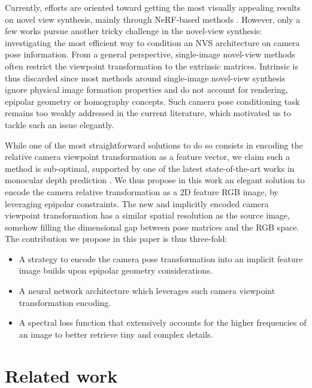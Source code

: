 Currently, efforts are oriented toward getting the most visually appealing results on novel view synthesis, mainly through NeRF-based methods \citep{mildenhall2021nerf,wang2021neus,barron2021mip,barron2022mip}. However, only a few works pursue another tricky challenge in the novel-view synthesis: investigating the most efficient way to condition an NVS architecture on camera pose information. From a general perspective, single-image novel-view methods often restrict the viewpoint transformation to the extrinsic matrices. Intrinsic is thus discarded since most methods around single-image novel-view synthesis ignore physical image formation properties and do not account for rendering, epipolar geometry or homography concepts. Such camera pose conditioning task remains too weakly addressed in the current literature, which motivated us to tackle such an issue elegantly.

While one of the most straightforward solutions to do so consists in encoding the relative camera viewpoint transformation as a feature vector, we claim such a method is sub-optimal, supported by one of the latest state-of-the-art works in monocular depth prediction \citep{zhao2021camera}. We thus propose in this work an elegant solution to encode the camera relative transformation as a 2D feature RGB image, by leveraging epipolar constraints. The new and implicitly encoded camera viewpoint transformation has a similar spatial resolution as the source image, somehow filling the dimensional gap between pose matrices and the RGB space. The contribution we propose in this paper is thus three-fold: 
\begin{itemize}
	\item A strategy to encode the camera pose transformation into an implicit feature image builds upon epipolar geometry considerations. 
	\item A neural network architecture which leverages such camera viewpoint transformation encoding. 
	\item A spectral loss function that extensively accounts for the higher frequencies of an image to better retrieve tiny and complex details.
\end{itemize}

\section{Related work}

